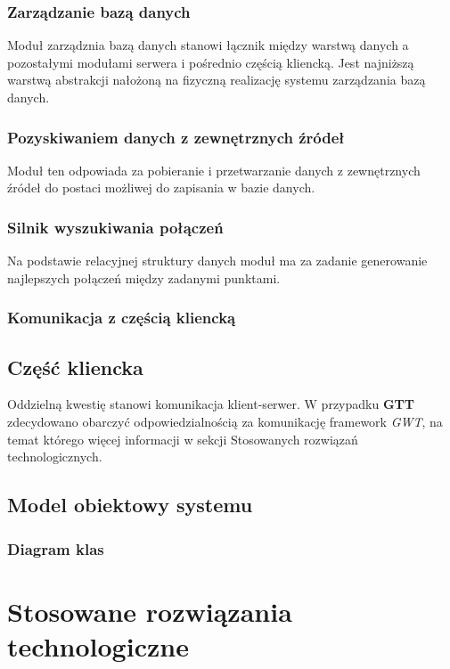 \documentclass[a4paper,12pt]{article}
\begin{document}
\subsubsection{Zarządzanie bazą danych}
Moduł zarządznia bazą danych stanowi łącznik między warstwą danych a
pozostałymi modułami serwera i pośrednio częścią kliencką. Jest najniższą
warstwą abstrakcji nałożoną na fizyczną realizację systemu zarządzania bazą
danych. 
 
\subsubsection{Pozyskiwaniem danych z zewnętrznych źródeł}
Moduł ten odpowiada za pobieranie i przetwarzanie danych z zewnętrznych źródeł
do postaci możliwej do zapisania w bazie danych.
 

\subsubsection{Silnik wyszukiwania połączeń}
Na podstawie relacyjnej struktury danych moduł ma za zadanie generowanie
najlepszych połączeń między zadanymi punktami.

\subsubsection{Komunikacja z częścią kliencką}

\subsection{Część kliencka}

Oddzielną kwestię stanowi komunikacja klient-serwer. W przypadku \textbf{GTT}
zdecydowano obarczyć odpowiedzialnością za komunikację framework \emph{GWT}, na
temat którego więcej informacji w sekcji Stosowanych rozwiązań technologicznych.
\subsection{Model obiektowy systemu}
\subsubsection{Diagram klas}
\section{Stosowane rozwiązania technologiczne}
\end{document}
